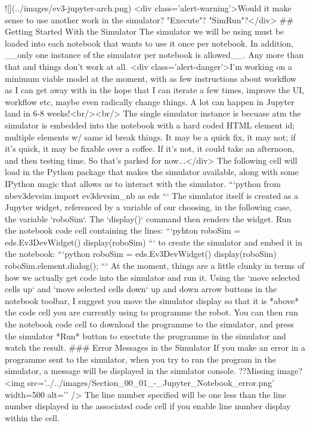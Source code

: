 \documentclass[letterpaper,10pt,english]{sphinxmanual}
\begin{document}
{![](../images/ev3-jupyter-arch.png)
<div class='alert-warning'>Would it make sense to use another work in the simulator? "Execute"? "SimRun"?</div>
## Getting Started With the Simulator
The simulator we will be using must be loaded into each notebook that wants to use it once per notebook. In addition, __only one instance of the simulator per notebook is allowed__. Any more than that and things don't work at all.
<div class='alert-danger'>I'm working on a minimum viable model at the moment, with as few instructions about workflow as I can get away with in the hope that I can iterate a few times, improve the UI, workflow etc, maybe even radically change things. A lot can happen in Jupyter land in 6-8 weeks!<br/><br/>
The single simulator instance is becuase atm the simulator is embedded into the notebook with a hard coded HTML element id; multiple elements w/ same id break things. It may be a quick fix, it may not; if it's quick, it may be fixable over a coffee. If it's not, it could take an afternoon, and then testing time. So that's parked for now...</div>
The following cell will load in the Python package that makes the simulator available, along with some IPython magic that allows us to interact with the simulator.
```python
from nbev3devsim import ev3devsim_nb as eds
```
The simulator itself is created as a Jupyter widget, referenced by a variable of our choosing, in the following case, the variable `roboSim`. The `display()` command then renders the widget.
Run the notebook code cell containing the lines:
```pyhton
roboSim = eds.Ev3DevWidget()
display(roboSim)
```
to create the simulator and embed it in the notebook:
```python
roboSim = eds.Ev3DevWidget()
display(roboSim)
roboSim.element.dialog();
```
At the moment, things are a little clunky in terms of how we actually get code into the simulator and run it.
Using the `move selected cells up` and `move selected cells down` up and down arrow buttons in the notebook toolbar, I suggest you move the simulator display so that it is *above* the code cell you are currently using to programme the robot.
You can then run the notebook code cell to download the programme to the simulator, and press the simulator *Run* button to exectute the programme in the simulator and watch the result.
### Error Messages in the Simulator
If you make an error in a programme sent to the simulator, when you try to run the program in the simulator, a message will be displayed in the simulator console.
??Missing image?
<img src='../../images/Section_00_01_-_Jupyter_Notebook_error.png' width=500 alt='' />
The line number specified will be one less than the line number displayed in the associated code cell if you enable line number display within the cell.
}
\end{document}
